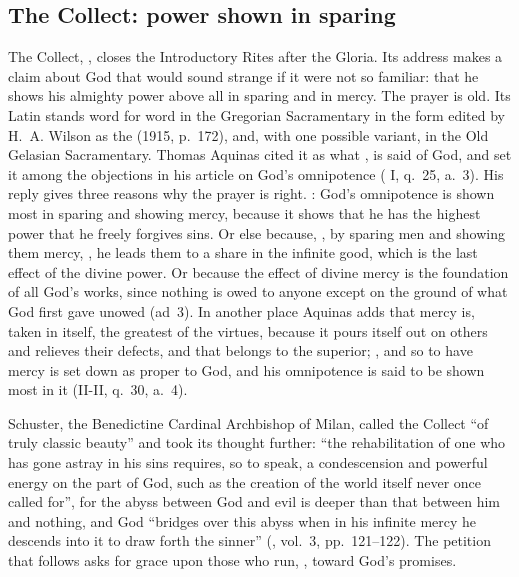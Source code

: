 \subsection{The Collect: power shown in sparing}

The Collect, , closes the Introductory
Rites after the Gloria. Its address makes a claim about God that would sound
strange if it were not so familiar: that he shows his almighty power above all
in sparing and in mercy. The prayer is old. Its Latin stands word for word in
the Gregorian Sacramentary in the form edited by H.~A. Wilson as the
 (1915, p.~172), and, with one possible variant, in the Old
Gelasian Sacramentary. Thomas Aquinas cited it as what , is said of God, and
set it among the objections in his article on God's omnipotence
( I, q.~25, a.~3). His reply gives three reasons why
the prayer is right. : God's omnipotence is shown most in sparing and showing
mercy, because it shows that he has the highest power that he freely forgives
sins. Or else because, , by sparing men
and showing them mercy, , he leads them to a share in the
infinite good, which is the last effect of the divine power. Or because the
effect of divine mercy is the foundation of all God's works, since nothing is
owed to anyone except on the ground of what God first gave unowed (ad~3). In
another place Aquinas adds that mercy is, taken in itself, the greatest of the
virtues, because it pours itself out on others and relieves their defects, and
that belongs to the superior; , and so to have mercy is
set down as proper to God, and his omnipotence is said to be shown most in it
(II-II, q.~30, a.~4).

Schuster, the Benedictine Cardinal Archbishop of Milan, called
the Collect ``of truly classic beauty'' and took its thought further: ``the
rehabilitation of one who has gone astray in his sins requires, so to speak, a
condescension and powerful energy on the part of God, such as the creation of
the world itself never once called for'', for the abyss between God and evil
is deeper than that between him and nothing, and God ``bridges over this abyss
when in his infinite mercy he descends into it to draw forth the sinner''
(, vol.~3, pp.~121--122). The petition that follows asks
for grace upon those who run, , toward God's promises.

